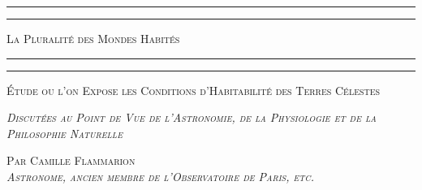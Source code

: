 \documentclass[a4paper, 11pt, oneside, landscape]{article}
\begin{document}
\begin{titlepage} %
	\centering %

	
	\rule{\textwidth}{1.6pt}\vspace*{-\baselineskip}\vspace*{2pt} %
	\rule{\textwidth}{0.4pt} %
	
	\vspace{0.1\baselineskip} %
	
	{\scshape\LARGE La Pluralité des Mondes Habités}
	
	\vspace{0.1\baselineskip} %

	\rule{\textwidth}{0.4pt}\vspace*{-\baselineskip}\vspace{3.2pt} %
	\rule{\textwidth}{1.6pt} %
	
	\vspace{0.1\baselineskip} %
	
	
	{\scshape \large Étude ou l'on Expose les Conditions d'Habitabilité des Terres Célestes} %
	
	\vspace*{0.1\baselineskip} %

        {\scshape \small \emph{Discutées au Point de Vue de l'Astronomie, de la Physiologie et de la Philosophie Naturelle}}

 	\vspace*{0.1\baselineskip} %

        {\scshape \small Par \normalsize Camille Flammarion\\\scriptsize \emph{Astronome, ancien membre de l'Observatoire de Paris, etc.}} %
    
 	\vspace{0.1\baselineskip}


\end{titlepage}
\end{document}
